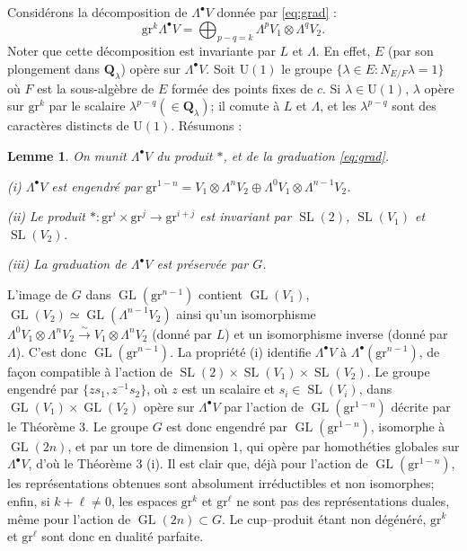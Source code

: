 \documentclass[11pt,a4paper]{article}
\theoremstyle{plain}
\newtheorem{lemma}[theorem]{Lemme}
\theoremstyle{definition}
\DeclareMathOperator{\SL}{SL}
\DeclareMathOperator{\GL}{GL}
\begin{document}
Consid\'erons la d\'ecomposition de $\Lambda^\bullet V$ donn\'ee par \eqref{eq:grad} :
\[
\mathrm{gr}^k \Lambda^\bullet V = \bigoplus_{p-q=k} \Lambda^p V_1 \otimes \Lambda^q V_2 .
\]
Noter que cette d\'ecomposition est invariante par $L$ et $\Lambda$. En effet, $E$ (par son plongement dans $\mathbf{Q}_\lambda$) op\`ere sur $\Lambda^\bullet V$. Soit $\mathrm{U}(1)$ le groupe $\{\lambda \in E : N_{E/F} \lambda = 1\}$ o\`u $F$ est la sous-alg\`ebre de $E$ form\'ee des points fixes de $c$. Si $\lambda \in \mathrm{U}(1)$, $\lambda$ op\`ere sur $\mathrm{gr}^k$ par le scalaire $\lambda^{p-q} (\in \mathbf{Q}_\lambda)$; il comute \`a $L$ et $\Lambda$, et les $\lambda^{p-q}$ sont des caract\`eres distincts de $\mathrm{U}(1)$. R\'esumons :

\begin{lemma}\label{lem:4.1}
On munit $\Lambda^\bullet V$ du produit $*$, et de la graduation \eqref{eq:grad}.

\emph{(i)} $\Lambda^\bullet V$ est engendr\'e par $\mathrm{gr}^{1-n} = V_1 \otimes \Lambda^n V_2 \oplus \Lambda^0 V_1 \otimes \Lambda^{n-1} V_2$.

\emph{(ii)} Le produit $* : \mathrm{gr}^i \times \mathrm{gr}^j \to \mathrm{gr}^{i+j}$ est invariant par $\SL(2)$, $\SL(V_1)$ et $\SL(V_2)$.

\emph{(iii)} La graduation de $\Lambda^\bullet V$ est pr\'eserv\'ee par $G$.
\end{lemma}

L'image de $G$ dans $\GL(\mathrm{gr}^{n-1})$ contient $\GL(V_1)$, $\GL(V_2) \simeq \GL(\Lambda^{n-1} V_2)$ ainsi qu'un isomorphisme $\Lambda^0 V_1 \otimes \Lambda^n V_2 \xrightarrow{\sim} V_1 \otimes \Lambda^n V_2$ (donn\'e par $L$) et un isomorphisme inverse (donn\'e par $\Lambda$). C'est donc $\GL(\mathrm{gr}^{n-1})$. La propri\'et\'e (i) identifie $\Lambda^\bullet V$ \`a $\Lambda^\bullet(\mathrm{gr}^{n-1})$, de fa\c{c}on compatible \`a l'action de $\SL(2) \times \SL(V_1) \times \SL(V_2)$. Le groupe engendr\'e par $\{zs_1, z^{-1}s_2\}$, o\`u $z$ est un scalaire et $s_i \in \SL(V_i)$, dans $\GL(V_1) \times \GL(V_2)$ op\`ere sur $\Lambda^\bullet V$ par l'action de $\GL(\mathrm{gr}^{1-n})$ d\'ecrite par le Th\'eor\`eme 3. Le groupe $G$ est donc engendr\'e par $\GL(\mathrm{gr}^{1-n})$, isomorphe \`a $\GL(2n)$, et par un tore de dimension $1$, qui op\`ere par homoth\'eties globales sur $\Lambda^\bullet V$, d'o\`u le Th\'eor\`eme 3 (i). Il est clair que, d\'ej\`a pour l'action de $\GL(\mathrm{gr}^{1-n})$, les repr\'esentations obtenues sont absolument irr\'eductibles et non isomorphes; enfin, si $k + \ell \neq 0$, les espaces $\mathrm{gr}^k$ et $\mathrm{gr}^\ell$ ne sont pas des repr\'esentations duales, m\^eme pour l'action de $\GL(2n) \subset G$. Le cup--produit \'etant non d\'eg\'en\'er\'e, $\mathrm{gr}^k$ et $\mathrm{gr}^\ell$ sont donc en dualit\'e parfaite.
\end{document}
